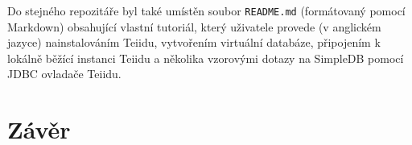\documentclass[oneside,12pt,final]{fithesis2}
\begin{document}
Do stejného repozitáře byl také umístěn soubor \texttt{README.md} (formátovaný pomocí Markdown) obsahující vlastní tutoriál, který uživatele provede (v anglickém jazyce) nainstalováním Teiidu, vytvořením virtuální databáze, připojením k lokálně běžící instanci Teiidu a několika vzorovými dotazy na SimpleDB pomocí JDBC ovladače Teiidu.
\chapter{Závěr}

\end{document}
